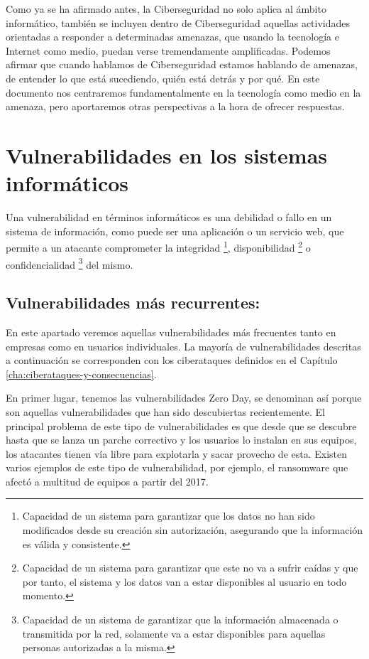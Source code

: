 Como ya se ha afirmado antes, la Ciberseguridad no solo aplica al ámbito informático, también se incluyen dentro de Ciberseguridad 
aquellas actividades orientadas a responder a determinadas amenazas, que usando la tecnología e Internet como medio, puedan 
verse tremendamente amplificadas. Podemos afirmar que cuando hablamos de Ciberseguridad estamos hablando de amenazas, 
de entender lo que está sucediendo, quién está detrás y por qué. En este documento nos centraremos fundamentalmente en la 
tecnología como medio en la amenaza, pero aportaremos otras perspectivas a la hora de ofrecer respuestas.




\chapter{Vulnerabilidades en los sistemas informáticos}
\label{cha:vulneravilidades-y-ataques}

Una vulnerabilidad en términos informáticos es una debilidad o fallo en un sistema de información, como puede ser una aplicación o un servicio web, que permite a un atacante comprometer la integridad \footnote{Capacidad de un sistema para garantizar que los datos no han sido modificados desde su creación sin autorización, asegurando que la información es válida y consistente.}, disponibilidad \footnote{Capacidad de un sistema para garantizar que este no va a sufrir caídas y que por tanto, el sistema y los datos van a estar disponibles al usuario en todo momento.} o confidencialidad \footnote{Capacidad de un sistema de garantizar que la información almacenada o transmitida por la red, solamente va a estar disponibles para aquellas personas autorizadas a la misma.} del mismo.

\section{Vulnerabilidades más recurrentes:}
En este apartado veremos aquellas vulnerabilidades más frecuentes tanto en empresas como en usuarios individuales. La mayoría de vulnerabilidades descritas a continuación se corresponden con los ciberataques definidos en el Capítulo \ref{cha:ciberataques-y-consecuencias}.\cite{vulnerabilidades2}

En primer lugar, tenemos las vulnerabilidades Zero Day, se denominan así porque son aquellas 
vulnerabilidades que han sido descubiertas recientemente. El principal problema de este tipo de 
vulnerabilidades es que desde que se descubre hasta que se lanza un parche correctivo y los 
usuarios lo instalan en sus equipos, los atacantes tienen vía libre para explotarla y sacar provecho 
de esta. Existen varios ejemplos de este tipo de vulnerabilidad, por ejemplo, el ransomware que afectó a 
multitud de equipos a partir del 2017.

